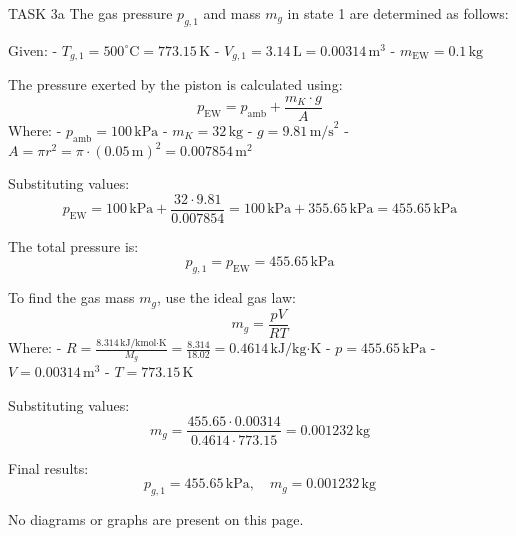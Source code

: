 TASK 3a  
The gas pressure \( p_{g,1} \) and mass \( m_g \) in state 1 are determined as follows:

Given:  
- \( T_{g,1} = 500^\circ\text{C} = 773.15 \, \text{K} \)  
- \( V_{g,1} = 3.14 \, \text{L} = 0.00314 \, \text{m}^3 \)  
- \( m_{\text{EW}} = 0.1 \, \text{kg} \)  

The pressure exerted by the piston is calculated using:  
\[
p_{\text{EW}} = p_{\text{amb}} + \frac{m_K \cdot g}{A}
\]  
Where:  
- \( p_{\text{amb}} = 100 \, \text{kPa} \)  
- \( m_K = 32 \, \text{kg} \)  
- \( g = 9.81 \, \text{m/s}^2 \)  
- \( A = \pi r^2 = \pi \cdot (0.05 \, \text{m})^2 = 0.007854 \, \text{m}^2 \)  

Substituting values:  
\[
p_{\text{EW}} = 100 \, \text{kPa} + \frac{32 \cdot 9.81}{0.007854} = 100 \, \text{kPa} + 355.65 \, \text{kPa} = 455.65 \, \text{kPa}
\]  

The total pressure is:  
\[
p_{g,1} = p_{\text{EW}} = 455.65 \, \text{kPa}
\]  

To find the gas mass \( m_g \), use the ideal gas law:  
\[
m_g = \frac{p V}{R T}
\]  
Where:  
- \( R = \frac{8.314 \, \text{kJ/kmol·K}}{M_g} = \frac{8.314}{18.02} = 0.4614 \, \text{kJ/kg·K} \)  
- \( p = 455.65 \, \text{kPa} \)  
- \( V = 0.00314 \, \text{m}^3 \)  
- \( T = 773.15 \, \text{K} \)  

Substituting values:  
\[
m_g = \frac{455.65 \cdot 0.00314}{0.4614 \cdot 773.15} = 0.001232 \, \text{kg}
\]  

Final results:  
\[
p_{g,1} = 455.65 \, \text{kPa}, \quad m_g = 0.001232 \, \text{kg}
\]  

No diagrams or graphs are present on this page.